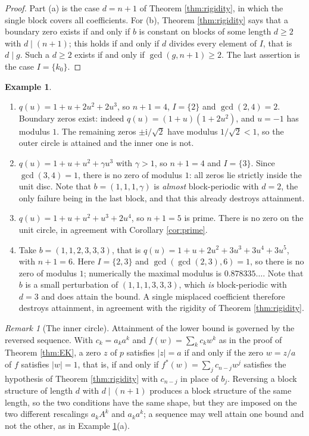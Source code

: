 \documentclass[11pt]{amsart}
\theoremstyle{plain}
\theoremstyle{definition}
\newtheorem{example}[theorem]{Example}
\theoremstyle{remark}
\newtheorem{remark}[theorem]{Remark}
\newcommand{\ii}{\mathrm{i}}
\newcommand{\abs}[1]{\lvert #1\rvert}
\newcommand{\set}[1]{\{#1\}}
\begin{document}
\begin{proof}
Part (a) is the case $d=n+1$ of Theorem \ref{thm:rigidity}, in which the single block
covers all coefficients. For (b), Theorem \ref{thm:rigidity} says that a boundary zero
exists if and only if $b$ is constant on blocks of some length $d\ge2$ with $d\mid(n+1)$;
this holds if and only if $d$ divides every element of $I$, that is $d\mid g$. Such a
$d\ge2$ exists if and only if $\gcd(g,n+1)\ge2$. The last assertion is the case
$I=\set{k_0}$.
\end{proof}

\begin{example}\label{ex:examples}
\leavevmode
\begin{enumerate}
\item[(a)] $q(u)=1+u+2u^{2}+2u^{3}$, so $n+1=4$, $I=\set2$ and $\gcd(2,4)=2$. Boundary
zeros exist: indeed $q(u)=(1+u)(1+2u^{2})$, and $u=-1$ has modulus $1$. The remaining zeros
$\pm\ii/\sqrt2$ have modulus $1/\sqrt2<1$, so the outer circle is attained and the inner one
is not.
\item[(b)] $q(u)=1+u+u^{2}+\gamma u^{3}$ with $\gamma>1$, so $n+1=4$ and $I=\set3$. Since
$\gcd(3,4)=1$, there is no zero of modulus $1$: all zeros lie strictly inside the unit
disc. Note that $b=(1,1,1,\gamma)$ is \emph{almost} block-periodic with $d=2$, the only
failure being in the last block, and that this already destroys attainment.
\item[(c)] $q(u)=1+u+u^{2}+u^{3}+2u^{4}$, so $n+1=5$ is prime. There is no zero on the unit
circle, in agreement with Corollary \ref{cor:prime}.
\item[(d)] Take $b=(1,1,2,3,3,3)$, that is
$q(u)=1+u+2u^{2}+3u^{3}+3u^{4}+3u^{5}$, with $n+1=6$. Here $I=\set{2,3}$ and
$\gcd(\gcd(2,3),6)=1$, so there is no zero of modulus $1$; numerically the maximal modulus
is $0.878335\ldots$. Note that $b$ is a small perturbation of $(1,1,1,3,3,3)$, which
\emph{is} block-periodic with $d=3$ and does attain the bound. A single misplaced
coefficient therefore destroys attainment, in agreement with the rigidity of
Theorem \ref{thm:rigidity}.
\end{enumerate}
\end{example}

\begin{remark}[The inner circle]\label{rem:dual}
Attainment of the lower bound is governed by the reversed sequence. With $c_k=a_ka^{k}$ and
$f(w)=\sum_kc_kw^{k}$ as in the proof of Theorem \ref{thm:EK}, a zero $z$ of $p$ satisfies
$\abs{z}=a$ if and only if the zero $w=z/a$ of $f$ satisfies $\abs{w}=1$, that is, if and
only if $f^{*}(w)=\sum_jc_{n-j}w^{j}$ satisfies the hypothesis of
Theorem \ref{thm:rigidity} with $c_{n-j}$ in place of $b_j$. Reversing a block structure of
length $d$ with $d\mid(n+1)$ produces a block structure of the same length, so the two
conditions have the same shape, but they are imposed on the two different rescalings
$a_kA^{k}$ and $a_ka^{k}$; a sequence may well attain one bound and not the other, as in
Example \ref{ex:examples}(a).
\end{remark}
\end{document}
